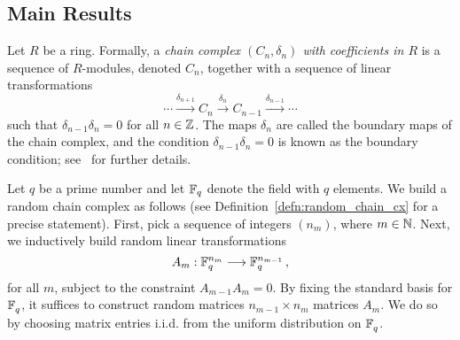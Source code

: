 \subsection*{Main Results}

Let $R$ be a ring.  Formally, a {\em chain complex $(C_n, \delta_n)$ with coefficients
in $R$} is a
sequence of $R$-modules, denoted $C_n$, together with a sequence of linear
transformations 
\[
  \cdots \xrightarrow{\delta_{n+1}} C_n \xrightarrow{\delta_n}
  C_{n-1} \xrightarrow{\delta_{n-1}} \cdots
\]
such that $\delta_{n-1}\delta_n = 0$ for all $n \in \mathbb{Z}$. The maps $\delta_n$ are called the boundary maps of the chain
complex, and the condition $\delta_{n-1} \delta_n = 0$ is known as the boundary
condition; see~\cite{hatcher2002algebraic} for further details.

%

Let $q$ be a prime number and let $\mathbb{F}_q$ denote the field with $q$ elements.
We build a random chain complex as follows (see Definition~\ref{defn:random_chain_cx}
for a precise statement). First, pick a 
sequence of integers $(n_m)$, where $m \in \mathbb{N}$. Next, we inductively
build random linear transformations 
\[
  A_m : \mathbb{F}_q^{n_m} \longrightarrow \mathbb{F}_q^{n_{m-1}} \, ,
\]
for all $m$, subject to the constraint $A_{m-1} A_m = 0$. By fixing the
standard basis for $\mathbb{F}_q^{}$, it suffices to construct random
matrices $n_{m-1} \times n_m$ matrices $A_m$. We do so by 
choosing matrix entries i.i.d. from the uniform distribution on
$\mathbb{F}_q^{}$. 


